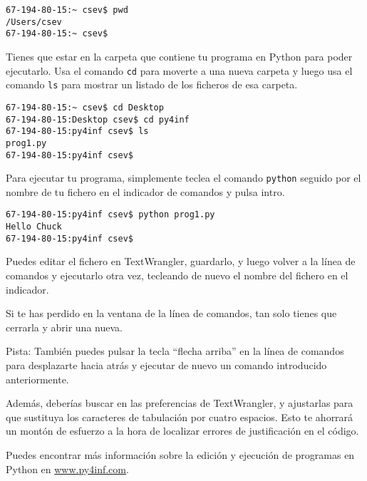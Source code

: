 \beforeverb
\begin{verbatim}
67-194-80-15:~ csev$ pwd
/Users/csev
67-194-80-15:~ csev$ 
\end{verbatim}
\afterverb
%
Tienes que estar en la carpeta que contiene tu programa en Python
para poder ejecutarlo. Usa el comando {\tt cd} para moverte a una nueva carpeta
y luego usa el comando {\tt ls} para mostrar un listado de los ficheros
de esa carpeta.

\beforeverb
\begin{verbatim}
67-194-80-15:~ csev$ cd Desktop
67-194-80-15:Desktop csev$ cd py4inf
67-194-80-15:py4inf csev$ ls
prog1.py
67-194-80-15:py4inf csev$ 
\end{verbatim}
\afterverb
%
Para ejecutar tu programa, simplemente teclea el comando {\tt python} seguido
por el nombre de tu fichero en el indicador de comandos y pulsa intro.

\beforeverb
\begin{verbatim}
67-194-80-15:py4inf csev$ python prog1.py
Hello Chuck
67-194-80-15:py4inf csev$ 
\end{verbatim}
\afterverb
%
Puedes editar el fichero en TextWrangler, guardarlo, y luego volver
a la línea de comandos y ejecutarlo otra vez, tecleando de nuevo
el nombre del fichero en el indicador.

Si te has perdido en la ventana de la línea de comandos, tan solo tienes
que cerrarla y abrir una nueva.

Pista: También puedes pulsar la tecla ``flecha arriba'' en la línea de comandos para
desplazarte hacia atrás y ejecutar de nuevo un comando introducido anteriormente.

Además, deberías buscar en las preferencias de TextWrangler, y ajustarlas para
que sustituya los caracteres de tabulación por cuatro espacios. Esto te ahorrará
un montón de esfuerzo a la hora de localizar errores de justificación en el código.

Puedes encontrar más información sobre la edición y ejecución de
programas en Python en \url{www.py4inf.com}.


